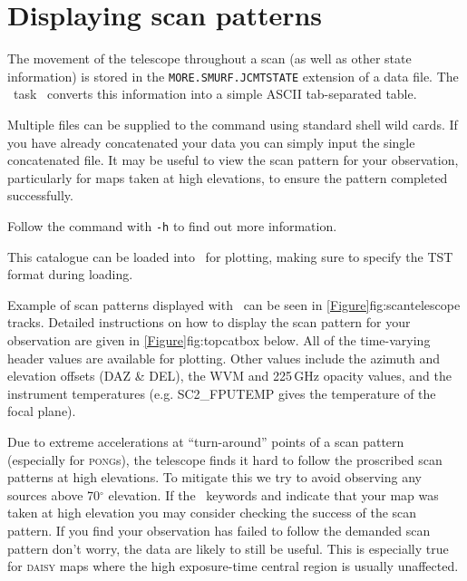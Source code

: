 \section{Displaying scan patterns}
\label{sec:scan}

The movement of the telescope throughout a scan (as well as other
state information) is stored in the \texttt{MORE.SMURF.JCMTSTATE}
extension of a data file. The \smurf\ task \jcmtstate\ converts this
information into a simple ASCII tab-separated table.

\begin{terminalv}
\end{terminalv}

Multiple files can be supplied to the command using standard shell
wild cards. If you have already concatenated your data you can simply
input the single concatenated file. It may be useful to view the scan
pattern for your observation, particularly for maps taken at high
elevations, to ensure the pattern completed successfully.


\begin{tip}
  Follow the  command with \texttt{-h} to find out
  more information.
\end{tip}


This catalogue can be loaded into \topcat\ for plotting, making sure
to specify the TST format during loading.

\begin{terminalv}
\end{terminalv}

Example of scan patterns displayed with \topcat\ can be seen in
\cref{Figure}{fig:scan}{telescope tracks}. Detailed instructions on
how to display the scan pattern for your observation are given in
\cref{Figure}{fig:topcat}{box below}.  All of the time-varying header
values are available for plotting. Other values include the azimuth
and elevation offsets (DAZ \& DEL), the WVM and 225\,GHz opacity
values, and the instrument temperatures (e.g.  SC2\_FPUTEMP gives the
temperature of the focal plane).

Due to extreme accelerations at ``turn-around'' points of a scan
pattern (especially for \textsc{pong}s), the telescope finds it hard
to follow the proscribed scan patterns at high elevations. To mitigate
this we try to avoid observing any sources above 70$^\circ$ elevation.
If the \fitslist\ keywords  and 
indicate that your map was taken at high elevation you may consider
checking the success of the scan pattern. If you find your observation
has failed to follow the demanded scan pattern don't worry, the data are
likely to still be useful. This is especially true for \textsc{daisy}
maps where the high exposure-time central region is usually
unaffected.


